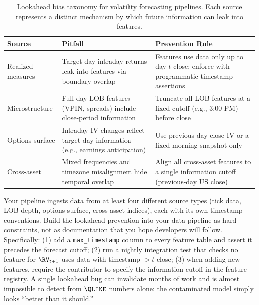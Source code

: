 \begin{table}[ht]
\centering
\caption{Lookahead bias taxonomy for volatility forecasting pipelines.
Each source represents a distinct mechanism by which future information can leak into features.}
\label{tab:lookahead-taxonomy}
\small
\begin{tabular}{@{}p{2.2cm}p{5.0cm}p{5.5cm}@{}}
\toprule
\textbf{Source} & \textbf{Pitfall} & \textbf{Prevention Rule} \\
\midrule
Realized measures
  & Target-day intraday returns leak into features via boundary overlap
  & Features use data only up to day $t$ close; enforce with programmatic timestamp assertions \\
\addlinespace
Microstructure
  & Full-day LOB features (VPIN, spreads) include close-period information
  & Truncate all LOB features at a fixed cutoff (e.g., 3:00 PM) before close \\
\addlinespace
Options surface
  & Intraday IV changes reflect target-day information (e.g., earnings anticipation)
  & Use previous-day close IV or a fixed morning snapshot only \\
\addlinespace
Cross-asset
  & Mixed frequencies and timezone misalignment hide temporal overlap
  & Align all cross-asset features to a single information cutoff (previous-day US close) \\
\bottomrule
\end{tabular}
\end{table}

\begin{projectconnection}
Your pipeline ingests data from at least four different source types (tick data, LOB depth, options surface, cross-asset indices), each with its own timestamp conventions.
Build the lookahead prevention into your data pipeline as hard constraints, not as documentation that you hope developers will follow.
Specifically:
(1) add a \texttt{max\_timestamp} column to every feature table and assert it precedes the forecast cutoff;
(2) run a nightly integration test that checks no feature for $\RV_{t+1}$ uses data with timestamp $> t$ close;
(3) when adding new features, require the contributor to specify the information cutoff in the feature registry.
A single lookahead bug can invalidate months of work and is almost impossible to detect from $\QLIKE$ numbers alone: the contaminated model simply looks ``better than it should.''
\end{projectconnection}


